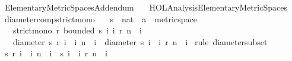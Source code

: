 %
\begin{isabellebody}%
%
%
\isadelimtheory
%
\endisadelimtheory
%
\isatagtheory
{}\isamarkupfalse%
\ Elementary{\isacharunderscore}{\kern0pt}Metric{\isacharunderscore}{\kern0pt}Spaces{\isacharunderscore}{\kern0pt}Addendum\isanewline
\ \ \ {\isachardoublequoteopen}HOL{\isacharminus}{\kern0pt}Analysis{\isachardot}{\kern0pt}Elementary{\isacharunderscore}{\kern0pt}Metric{\isacharunderscore}{\kern0pt}Spaces{\isachardoublequoteclose}\isanewline
{}%
\endisatagtheory
{\isafoldtheory}%
%
\isadelimtheory
%
\endisadelimtheory
%
\isadelimdocument
%
\endisadelimdocument
%
\isatagdocument
%
\isamarkuptrue%
%
\endisatagdocument
{\isafolddocument}%
%
\isadelimdocument
%
\endisadelimdocument
{}\isamarkupfalse%
\ diameter{\isacharunderscore}{\kern0pt}comp{\isacharunderscore}{\kern0pt}strict{\isacharunderscore}{\kern0pt}mono{\isacharcolon}{\kern0pt}\isanewline
\ \ \ s\ {\isacharcolon}{\kern0pt}{\isacharcolon}{\kern0pt}\ {\isachardoublequoteopen}nat\ {\isasymRightarrow}\ {\isacharprime}{\kern0pt}a\ {\isacharcolon}{\kern0pt}{\isacharcolon}{\kern0pt}\ metric{\isacharunderscore}{\kern0pt}space{\isachardoublequoteclose}\isanewline
\ \ \ {\isachardoublequoteopen}strict{\isacharunderscore}{\kern0pt}mono\ r{\isachardoublequoteclose}\ {\isachardoublequoteopen}bounded\ {\isacharbraceleft}{\kern0pt}s\ i\ {\isacharbar}{\kern0pt}i{\isachardot}{\kern0pt}\ r\ n\ {\isasymle}\ i{\isacharbraceright}{\kern0pt}{\isachardoublequoteclose}\isanewline
\ \ \ {\isachardoublequoteopen}diameter\ {\isacharbraceleft}{\kern0pt}s\ {\isacharparenleft}{\kern0pt}r\ i{\isacharparenright}{\kern0pt}\ {\isacharbar}{\kern0pt}\ i{\isachardot}{\kern0pt}\ n\ {\isasymle}\ i{\isacharbraceright}{\kern0pt}\ {\isasymle}\ diameter\ {\isacharbraceleft}{\kern0pt}s\ i\ {\isacharbar}{\kern0pt}\ i{\isachardot}{\kern0pt}\ r\ n\ {\isasymle}\ i{\isacharbraceright}{\kern0pt}{\isachardoublequoteclose}\isanewline
%
\isadelimproof
%
\endisadelimproof
%
\isatagproof
{}\isamarkupfalse%
\ {\isacharparenleft}{\kern0pt}rule\ diameter{\isacharunderscore}{\kern0pt}subset{\isacharparenright}{\kern0pt}\isanewline
\ \ \isamarkupfalse%
\ {\isachardoublequoteopen}{\isacharbraceleft}{\kern0pt}s\ {\isacharparenleft}{\kern0pt}r\ i{\isacharparenright}{\kern0pt}\ {\isacharbar}{\kern0pt}\ i{\isachardot}{\kern0pt}\ n\ {\isasymle}\ i{\isacharbraceright}{\kern0pt}\ {\isasymsubseteq}\ {\isacharbraceleft}{\kern0pt}s\ i\ {\isacharbar}{\kern0pt}\ i{\isachardot}{\kern0pt}\ r\ n\ {\isasymle}\ i{\isacharbraceright}{\kern0pt}{\isachardoublequoteclose}\ \isamarkupfalse%

\end{isabellebody}
